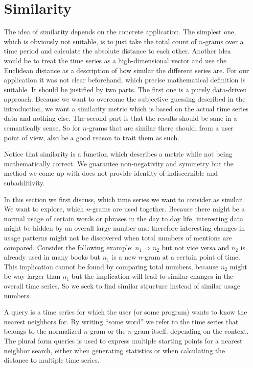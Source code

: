 \section{Similarity}
\label{sec:baseline:sim}
The idea of similarity depends on the concrete application. The simplest one, which is obviously not suitable, is to just take the total count of $n$-grams over a time period and calculate the absolute distance to each other. Another idea would be to treat the time series as a high-dimensional vector and use the Euclidean distance as a description of how similar the different series are. For our application it was not clear beforehand, which precise mathematical definition is suitable. It should be justified by two parts. The first one is a purely data-driven approach. Because we want to overcome the subjective guessing described in the introduction, we want a similarity metric which is based on the actual time series data and nothing else. The second part is that the results should be sane in a semantically sense. So for $n$-grams that are similar there should, from a user point of view, also be a good reason to trait them as such.

Notice that similarity is a function which describes a metric while not being mathematically correct. We guarantee non-negativity and symmetry but the method we come up with does not provide identity of indiscernible and subadditivity.

In this section we first discuss, which time series we want to consider as similar. We want to explore, which $n$-grams are used together. Because there might be a normal usage of certain words or phrases in the day to day life, interesting data might be hidden by an overall large number and therefore interesting changes in usage patterns might not be discovered when total numbers of mentions are compared. Consider the following example: $n_1 \Rightarrow n_2$ but not vice versa and $n_2$ is already used in many books but $n_1$ is a new $n$-gram at a certain point of time. This implication cannot be found by comparing total numbers, because $n_2$ might be way larger than $n_1$ but the implication will lead to similar changes in the overall time series. So we seek to find similar structure instead of similar usage numbers.

\begin{definition}[Query]
    A query is a time series for which the user (or some program) wants to know the nearest neighbors for. By writing \enquote{some word} we refer to the time series that belongs to the normalized $n$-gram or the $n$-gram itself, depending on the context. The plural form queries is used to express multiple starting points for a nearest neighbor search, either when generating statistics or when calculating the distance to multiple time series.
\end{definition}

